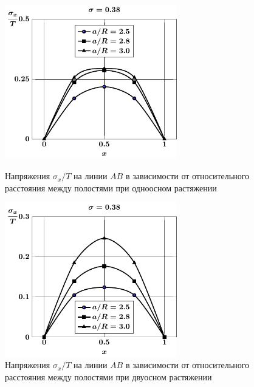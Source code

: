 \begin{russian}
\begin{figure}[th!]
\centering\footnotesize
\parbox[b]{7.5cm}{\centering\includegraphics[width=7.5cm]{spheres-cav9-a-t1-sig_x.pdf}
\caption{Напряжения $\sigma_x/T$ на линии $AB$ в зависимости от относительного расстояния между полостями при одноосном растяжении
\label{f:8:31}}}\hfil\hfil
\parbox[b]{7.5cm}{\centering\includegraphics[width=7.5cm]{spheres-cav9-a-t2-sig_x.pdf}
\caption{Напряжения $\sigma_x/T$ на линии $AB$ в зависимости от относительного расстояния между полостями при двуосном растяжении
\label{f:8:32}}}
\end{figure}


\end{russian}
